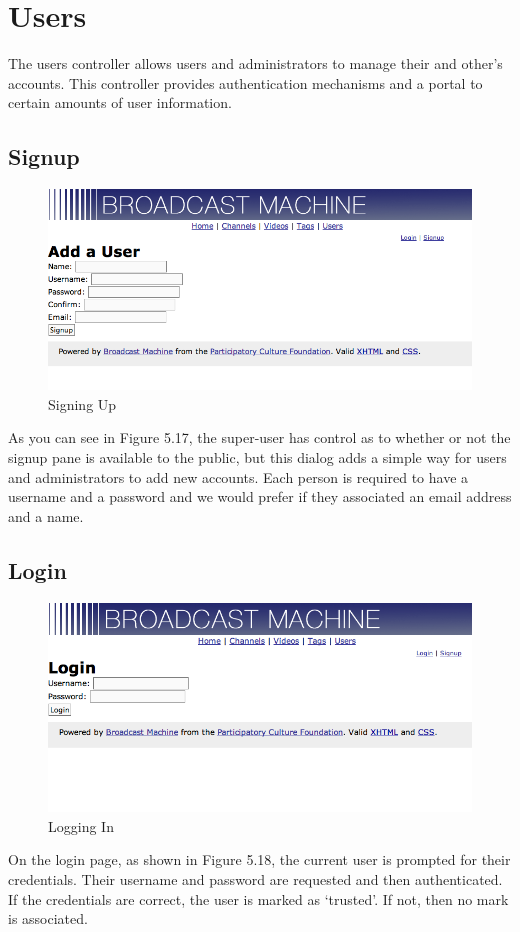 \documentclass[a4paper,12pt]{report}
\newcommand{\scare}[1]{`#1'}
\begin{document}
\section{Users}
The users controller allows users and administrators to manage their and other's accounts.
This controller provides authentication mechanisms and a portal to certain amounts of user information.

\subsection{Signup}
\begin{figure}[htp]
\begin{center}
\includegraphics[width=150mm]{./images/usersignup.png}
\end{center}
\caption{Signing Up}
\end{figure}
As you can see in Figure 5.17, the super-user has control as to whether or not the signup pane is available to the public, but this dialog adds a simple way for users and administrators to add new accounts.
Each person is required to have a username and a password and we would prefer if they associated an email address and a name.

\subsection{Login}
\begin{figure}[htp]
\begin{center}
\includegraphics[width=150mm]{./images/userlogin.png}
\end{center}
\caption{Logging In}
\end{figure}
On the login page, as shown in Figure 5.18, the current user is prompted for their credentials.
Their username and password are requested and then authenticated.
If the credentials are correct, the user is marked as \scare{trusted}.
If not, then no mark is associated.
\end{document}

